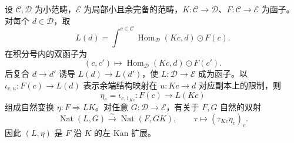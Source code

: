 \begin{theorem}\label{b4:thm:kan-coend-formula}
	设 \(\mathcal C,\mathcal D\) 为小范畴，\(\mathcal E\) 为局部小且余完备的范畴，\(K:\mathcal C\rightarrow\mathcal D\)、\(F:\mathcal C\rightarrow\mathcal E\) 为函子。对每个 \(d\in\mathcal D\)，取
	\begin{equation}\label{b4:eq:kan-coend-formula}
		L(d)=\int^{c\in\mathcal C}
		\operatorname{Hom}_{\mathcal D}(Kc,d)\odot F(c).
	\end{equation}
	在积分号内的双函子为
	\[
		(c,c')\longmapsto
		\operatorname{Hom}_{\mathcal D}(Kc,d)\odot F(c').
	\]
	后复合 \(d\rightarrow d'\) 诱导 \(L(d)\rightarrow L(d')\)，使 \(L:\mathcal D\rightarrow\mathcal E\) 成为函子。以 \(\iota_{c,u}:F(c)\rightarrow L(d)\) 表示余端结构映射在 \(u:Kc\rightarrow d\) 对应副本上的限制，则
	\[
		\eta_c=\iota_{c,1_{Kc}}:F(c)\longrightarrow L(Kc)
	\]
	组成自然变换 \(\eta:F\Rightarrow LK\)。对任意 \(G:\mathcal D\rightarrow\mathcal E\)，有关于 \(F,G\) 自然的双射
	\[
		\operatorname{Nat}(L,G)\xrightarrow{\sim}\operatorname{Nat}(F,GK),
		\qquad \tau\longmapsto(\tau_{Kc}\eta_c)_c.
	\]
	因此 \((L,\eta)\) 是 \(F\) 沿 \(K\) 的左 Kan 扩展。
\end{theorem}
